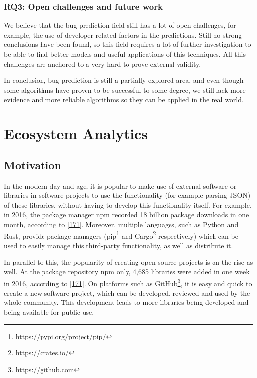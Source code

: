 \documentclass[]{book}
\let\rmarkdownfootnote\footnote%
\def\footnote{\protect\rmarkdownfootnote}
\begin{document}
\subsection{RQ3: Open challenges and future
work}\label{rq3-open-challenges-and-future-work}

We believe that the bug prediction field still has a lot of open
challenges, for example, the use of developer-related factors in the
predictions. Still no strong conclusions have been found, so this field
requires a lot of further investigation to be able to find better models
and useful applications of this techniques. All this challenges are
anchored to a very hard to prove external validity.

In conclusion, bug prediction is still a partially explored area, and
even though some algorithms have proven to be successful to some degree,
we still lack more evidence and more reliable algorithms so they can be
applied in the real world.

\chapter{Ecosystem Analytics}\label{ecosystem-analytics}

\section{Motivation}\label{motivation-3}

In the modern day and age, it is popular to make use of external
software or libraries in software projects to use the functionality (for
example parsing JSON) of these libraries, without having to develop this
functionality itself. For example, in 2016, the package manager npm
recorded 18 billion package downloads in one month, according to
{[}\protect\hyperlink{ref-Linux2016}{171}{]}. Moreover, multiple
languages, such as Python and Rust, provide package managers
(pip\footnote{\url{https://pypi.org/project/pip/}} and Cargo\footnote{\url{https://crates.io/}}
respectively) which can be used to easily manage this third-party
functionality, as well as distribute it.

In parallel to this, the popularity of creating open source projects is
on the rise as well. At the package repository npm only, 4,685 libraries
were added in one week in 2016, according to
{[}\protect\hyperlink{ref-Linux2016}{171}{]}. On platforms such as
GitHub\footnote{\url{https://github.com}}, it is easy and quick to
create a new software project, which can be developed, reviewed and used
by the whole community. This development leads to more libraries being
developed and being available for public use.
\end{document}
